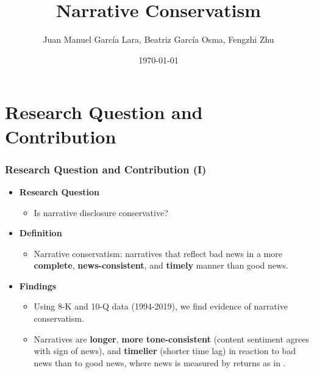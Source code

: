 \documentclass{beamer}
\title[Narrative Conservatism]{Narrative Conservatism} %
\author[]{Juan Manuel Garc\'ia Lara, Beatriz Garc\'ia Osma, Fengzhi Zhu} %
\institute[] %
{\textit{\textit{Universidad Carlos III de Madrid}} \\ %

	\bigskip
	
\medskip
\large IÉSEG School of Management

} %
\date{\today} %
\begin{document}
	
\begin{frame}
\titlepage %
\end{frame}


\section{Research Question and Contribution}

\begin{frame}
\frametitle{Research Question and Contribution (I)}
\begin{itemize}
\item \textbf{Research Question}

\begin{itemize}
\item Is narrative disclosure conservative?

\end{itemize}

\medskip
\pause

\item \textbf{Definition}
\begin{itemize}
	\item Narrative conservatism: narratives that reflect bad news in a more \textbf{complete}, \textbf{news-consistent}, and \textbf{timely} manner than good news.
\end{itemize}

\medskip
\pause

\item \textbf{Findings}
\begin{itemize}
\item Using 8-K and 10-Q data (1994-2019), we find evidence of narrative conservatism. 
\item Narratives are \textbf{longer}, \textbf{more tone-consistent} (content sentiment agrees with sign of news), and \textbf{timelier} (shorter time lag) in reaction to bad news than to good news, where news is measured by returns as in \citet{basuConservatismPrincipleAsymmetric1997}.

\end{itemize}






\end{itemize}
\end{frame}
\end{document}
